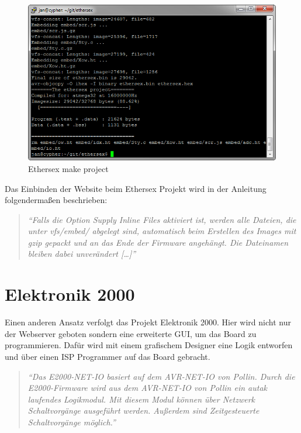 \begin{figure}[H]
	\centering
		\includegraphics[width=13cm]{content/pictures/Recherche/Ethersex/Ethersex2.png}
	\caption{Ethersex make project}
	\label{Ethersex2}
\end{figure} 

Das Einbinden der Website beim Ethersex Projekt wird in der Anleitung
folgendermaßen beschrieben:

\begin{quote}
	\textit{
		\enquote{Falls die Option Supply Inline Files aktiviert ist, werden alle
		Dateien, die unter vfs/embed/ abgelegt sind, automatisch beim Erstellen des
		Images mit gzip gepackt und an das Ende der Firmware angehängt. Die
		Dateinamen bleiben dabei unverändert [\ldots]} }
	\cite[\url{http://www.ethersex.de/index.php/HTTPD_(Deutsch)}]{Ethersex}
\end{quote}

\section{Elektronik 2000}

Einen anderen Ansatz verfolgt das Projekt Elektronik 2000.
Hier wird nicht nur der Webserver geboten sondern eine erweiterte GUI, um das
Board zu programmieren. Dafür wird mit einem grafischem Designer eine Logik
entworfen und über einen ISP Programmer auf das Board gebracht.

\begin{quote}
	\textit{
		\enquote{Das E2000-NET-IO basiert auf dem AVR-NET-IO von Pollin. Durch die
		E2000-Firmware wird aus dem AVR-NET-IO von Pollin ein autak laufendes
		Logikmodul. Mit diesem Modul können über Netzwerk Schaltvorgänge ausgeführt
		werden. Außerdem sind Zeitgesteuerte Schaltvorgänge möglich.} }
	\cite{elektronik2000}
\end{quote}

